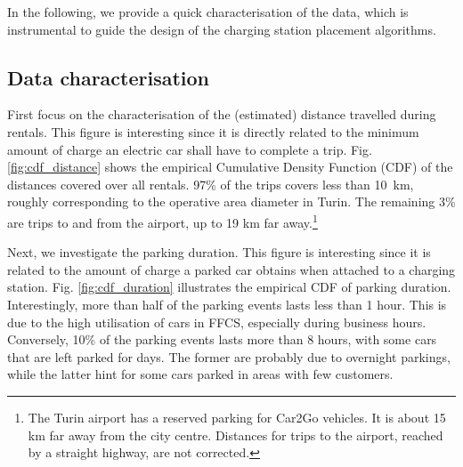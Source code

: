 In the following, we provide a quick characterisation of the data, which is instrumental to guide the design of the charging station placement algorithms.

\subsection{Data characterisation}

First focus on the characterisation of the (estimated) distance travelled during rentals. This figure is interesting since it is directly related to the minimum amount of charge an electric car shall have to complete a trip.
Fig. \ref{fig:cdf_distance} shows the empirical Cumulative Density Function (CDF) of the distances covered over all rentals. 97\% of the trips covers less than 10~km, roughly corresponding to the operative area diameter in Turin. The remaining 3\% are trips to and from the airport, up to 19 km far away.\footnote{The Turin airport has a reserved parking for Car2Go vehicles. It is about 15 km far away from the city centre. Distances for trips to the airport, reached by a straight highway, are not corrected.}

Next, we investigate the parking duration. This figure is interesting since it is related to the amount of charge a parked car obtains when attached to a charging station.
Fig. \ref{fig:cdf_duration} illustrates the empirical CDF of parking duration. Interestingly, more than half of the parking events lasts less than 1 hour. This is due to the high utilisation of cars in FFCS, especially during business hours.
Conversely, 10\% of the parking events lasts more than 8 hours, with some cars that are left parked for days. The former are probably due to overnight parkings, while the latter hint for some cars parked in areas with few customers.

